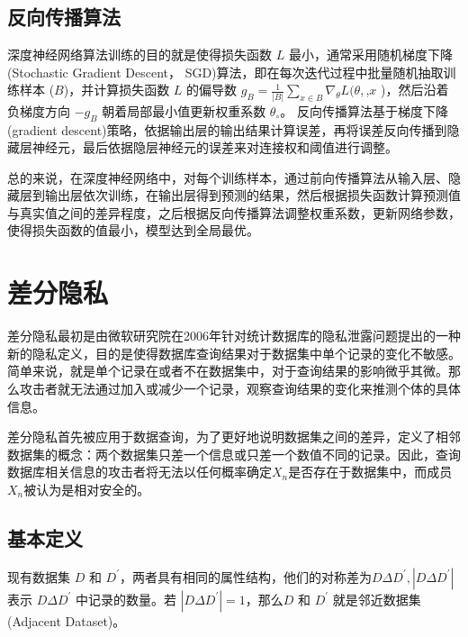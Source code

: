 \subsection{反向传播算法}
深度神经网络算法训练的目的就是使得损失函数 $L$ 最小，通常采用随机梯度下降(Stochastic Gradient Descent， SGD)算法，即在每次迭代过程中批量随机抽取训练样本 ($B$)，并计算损失函数 $L$ 的偏导数 $g_{B}=\frac{1}{|B|} \sum_{x \in B} \nabla_{\theta} L(\theta,$,$x$ )，然后沿着负梯度方向 $-g_{B}$ 朝着局部最小值更新权重系数 $\theta_{\circ}$。
反向传播算法基于梯度下降(gradient descent)策略，依据输出层的输出结果计算误差，再将误差反向传播到隐藏层神经元，最后依据隐层神经元的误差来对连接权和阈值进行调整。

总的来说，在深度神经网络中，对每个训练样本，通过前向传播算法从输入层、隐藏层到输出层依次训练，在输出层得到预测的结果，然后根据损失函数计算预测值与真实值之间的差异程度，之后根据反向传播算法调整权重系数，更新网络参数，使得损失函数的值最小，模型达到全局最优。

\section{差分隐私}
差分隐私最初是由微软研究院在2006年针对统计数据库的隐私泄露问题提出的一种新的隐私定义，目的是使得数据库查询结果对于数据集中单个记录的变化不敏感。简单来说，就是单个记录在或者不在数据集中，对于查询结果的影响微乎其微。那么攻击者就无法通过加入或减少一个记录，观察查询结果的变化来推测个体的具体信息。

差分隐私首先被应用于数据查询，为了更好地说明数据集之间的差异，定义了相邻数据集的概念：两个数据集只差一个信息或只差一个数值不同的记录。因此，查询数据库相关信息的攻击者将无法以任何概率确定$X_{n}$是否存在于数据集中，而成员$X_{n}$被认为是相对安全的。

\subsection{基本定义}
\begin{define}[邻近数据集]\label{邻近数据集}
现有数据集 $D$ 和 $D^{\prime}$，两者具有相同的属性结构，他们的对称差为$D \Delta D^{\prime},\left|D \Delta D^{\prime}\right|$ 表示 $D \Delta D^{\prime}$ 中记录的数量。若 $\left|D \Delta D^{\prime}\right|=1$，那么$D$ 和 $D^{\prime}$ 就是邻近数据集 (Adjacent Dataset)。
\end{define}

